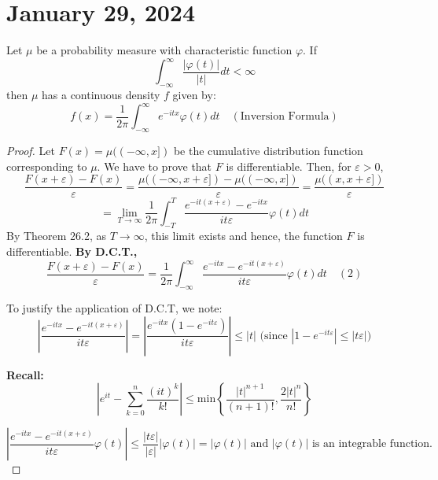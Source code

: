 \newpage
\section{January 29, 2024}
\begin{corollary}
Let \(\mu\) be a probability measure with characteristic function \(\varphi\). If
\[
\int_{-\infty}^{\infty} \frac{|\varphi(t)|}{|t|} dt < \infty
\]
then \(\mu\) has a continuous density \( f \) given by:
\[
f(x) = \frac{1}{2\pi} \int_{-\infty}^{\infty} e^{-itx} \varphi(t) dt \quad (\text{Inversion Formula})
\]
\end{corollary}

\begin{proof}
Let \( F(x) = \mu((-\infty, x]) \) be the cumulative distribution function corresponding to \(\mu\). We have to prove that \( F \) is differentiable. Then, for \( \varepsilon > 0 \),
\[
\frac{F(x+\varepsilon) - F(x)}{\varepsilon} = \frac{\mu((-\infty, x+\varepsilon]) - \mu((-\infty, x])}{\varepsilon} = \frac{\mu((x, x+\varepsilon])}{\varepsilon}
\]
\[
= \lim_{T \to \infty} \frac{1}{2\pi} \int_{-T}^{T} \frac{e^{-it(x+\varepsilon)} - e^{-itx}}{it\varepsilon} \varphi(t) dt
\]
By Theorem 26.2, as \( T \to \infty \), this limit exists and hence, the function \( F \) is differentiable.
\textbf{By D.C.T.,}
\begin{equation}
\frac{F(x+\varepsilon) - F(x)}{\varepsilon} = \frac{1}{2\pi} \int_{-\infty}^{\infty} \frac{e^{-itx} - e^{-it(x+\varepsilon)}}{it\varepsilon} \varphi(t) dt \quad (2)
\end{equation}

To justify the application of D.C.T, we note:
\[
\left| \frac{e^{-itx} - e^{-it(x+\varepsilon)}}{it\varepsilon} \right| = \left| \frac{e^{-itx}(1 - e^{-it\varepsilon})}{it\varepsilon} \right| \leq |t| \text{ (since } |1 - e^{-it\varepsilon}| \leq |t\varepsilon| \text{)}
\]

\textbf{Recall:}
\[
\left| e^{it} - \sum_{k=0}^{n} \frac{(it)^k}{k!} \right| \leq \text{min} \left\{ \frac{|t|^{n+1}}{(n+1)!}, \frac{2|t|^{n}}{n!} \right\}
\]

\[
\left| \frac{e^{-itx} - e^{-it(x+\varepsilon)}}{it\varepsilon} \varphi(t) \right| \leq \frac{|t\varepsilon|}{|\varepsilon|} |\varphi(t)| = |\varphi(t)| \text{ and } |\varphi(t)| \text{ is an integrable function.}
\]


\end{proof}
